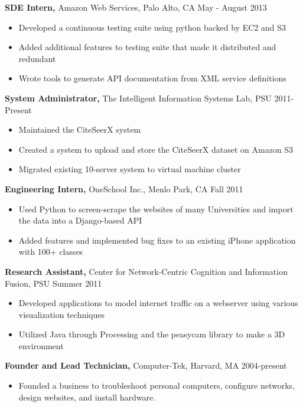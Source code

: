 \documentclass[margin]{res}
\begin{document}
\begin{resume}
{\bf SDE Intern,} Amazon Web Services, Palo Alto, CA \hfill May - August 2013
\begin{itemize} \itemsep -2pt  %
\item Developed a continuous testing suite using python backed by EC2 and S3
\item Added additional features to testing suite that made it distributed and redundant 
\item Wrote tools to generate API documentation from XML service definitions
\end{itemize}

{\bf System Administrator,} The Intelligent Information Systems Lab, PSU \hfill 2011-Present
\begin{itemize} \itemsep -2pt  %
\item Maintained the CiteSeerX system 
\item Created a system to upload and store the CiteSeerX dataset on Amazon S3
\item Migrated existing 10-server system to virtual machine cluster 
\end{itemize}
 
{\bf Engineering Intern,} OneSchool Inc., Menlo Park, CA \hfill Fall 2011
\begin{itemize} \itemsep -2pt %
\item Used Python to screen-scrape the websites of many Universities and import the data into a Django-based API
\item Added features and implemented bug fixes to an existing iPhone application with 100+ classes
\end{itemize}

{\bf Research Assistant,} Center for Network-Centric Cognition and Information Fusion, PSU \hfill Summer 2011
\begin{itemize} \itemsep -2pt
\item Developed applications to model internet traffic on a webserver using various visualization techniques 
\item Utilized Java through Processing and the peasycam library to make a 3D environment
\end{itemize}

{\bf Founder and Lead Technician,} Computer-Tek, Harvard, MA \hfill 2004-present
\begin{itemize} \itemsep -2pt
\item Founded a business to troubleshoot personal computers, configure networks, design websites, and install hardware.
\end{itemize}


\end{resume}
\end{document}
